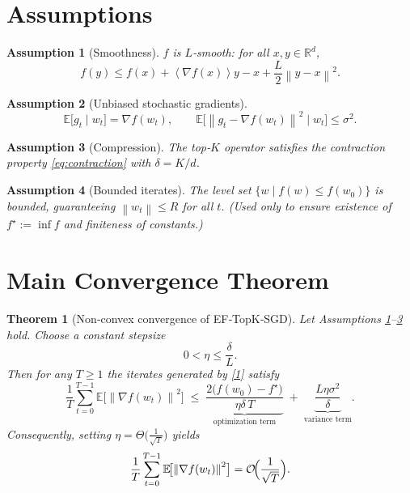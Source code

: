 \documentclass{article}
\newtheorem{theorem}{Theorem}
\newtheorem{assumption}{Assumption}
\newcommand{\E}{\mathbb{E}}
\newcommand{\R}{\mathbb{R}}
\newcommand{\norm}[1]{\left\|#1\right\|}
\newcommand{\inner}[1]{\left\langle#1\right\rangle}
\begin{document}
\section*{Assumptions}
\begin{assumption}[Smoothness]\label{as:smooth}
$f$ is $L$‑smooth: for all $x,y\in\R^d$,
\[
f(y)\le f(x)+\inner{\nabla f(x)}{y-x}+\frac{L}{2}\norm{y-x}^2 .
\]
\end{assumption}
\begin{assumption}[Unbiased stochastic gradients]\label{as:unbiased}
\[
\E\bigl[g_t\mid w_t\bigr]=\nabla f(w_t),\qquad 
\E\bigl[\norm{g_t-\nabla f(w_t)}^2\mid w_t\bigr]\le\sigma^2 .
\]
\end{assumption}
\begin{assumption}[Compression]\label{as:compress}
The top‑$K$ operator satisfies the contraction property \eqref{eq:contraction} with $\delta=K/d$.
\end{assumption}
\begin{assumption}[Bounded iterates]\label{as:bounded}
The level set $\{w\mid f(w)\le f(w_0)\}$ is bounded, guaranteeing $\norm{w_t}\le R$ for all $t$. (Used only to ensure existence of $f^\star:=\inf f$ and finiteness of constants.)
\end{assumption}

\section*{Main Convergence Theorem}
\begin{theorem}[Non‑convex convergence of EF‑TopK‑SGD]\label{thm:main}
Let Assumptions \ref{as:smooth}--\ref{as:compress} hold. Choose a constant stepsize
\[
0<\eta\le \frac{\delta}{L}.
\]
Then for any $T\ge1$ the iterates generated by \eqref{1} satisfy
\[
\frac{1}{T}\sum_{t=0}^{T-1}\E\!\bigl[\norm{\nabla f(w_t)}^2\bigr]
\;\le\;
\underbrace{\frac{2\bigl(f(w_0)-f^\star\bigr)}{\eta\delta\,T}}_{\text{optimization term}}
\;+\;
\underbrace{\frac{L\eta\sigma^2}{\delta}}_{\text{variance term}} .
\tag{2}
\]
Consequently, setting $\eta = \Theta\!\bigl(\frac{1}{\sqrt{T}}\bigr)$ yields
\[
\frac{1}{T}\sum_{t=0}^{T-1}\E\!\bigl[\norm{\nabla f(w_t)}^2\bigr]=
\mathcal{O}\!\Bigl(\frac{1}{\sqrt{T}}\Bigr) .
\]
\end{theorem}
\end{document}
